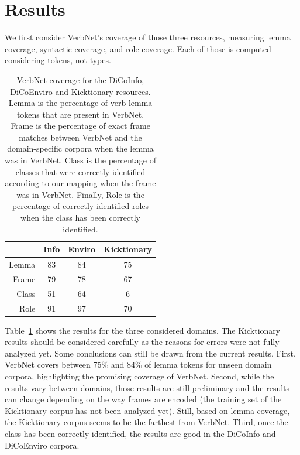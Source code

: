 \section{Results}
\label{sec:results}

We first consider VerbNet's coverage of those three resources, measuring lemma
coverage, syntactic coverage, and role coverage. Each of those is computed
considering tokens, not types.

\begin{table}[h]
\centering
\begin{tabular}{rccc}
  \toprule
        & Info & Enviro & Kicktionary \\
  \midrule
  Lemma & 83 & 84 & 75 \\
  Frame & 79 & 78 & 67 \\
  Class & 51 & 64 & 6  \\
  Role  & 91 & 97 & 70 \\
  \bottomrule
\end{tabular}

\caption{\protect\label{table:coverage} VerbNet coverage for the DiCoInfo,
DiCoEnviro and Kicktionary resources. Lemma is the percentage of verb lemma
tokens that are present in VerbNet. Frame is the percentage of exact frame
matches between VerbNet and the domain-specific corpora when the lemma was in
VerbNet. Class is the percentage of classes that were correctly identified
according to our mapping when the frame was in VerbNet. Finally, Role is the
percentage of correctly identified roles when the class has been correctly
identified.}

\end{table}

Table~\ref{table:coverage} shows the results for the three considered domains.
The Kicktionary results should be considered carefully as the reasons for
errors were not fully analyzed yet. Some conclusions can still be drawn from
the current results. First, VerbNet covers between 75\% and 84\% of lemma
tokens for unseen domain corpora, highlighting the promising coverage of
VerbNet.  Second, while the results vary between domains, those results are
still preliminary and the results can change depending on the way frames are
encoded (the training set of the Kicktionary corpus has not been analyzed yet).
Still, based on lemma coverage, the Kicktionary corpus seems to be the farthest
from VerbNet. Third, once the class has been correctly identified, the results
are good in the DiCoInfo and DiCoEnviro corpora.

